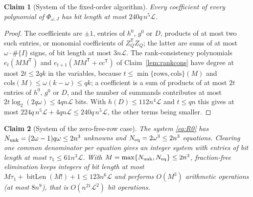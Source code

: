\documentclass[journal]{IEEEtran}
\theoremstyle{plainn}
\newtheorem{claim}{Claim}
\theoremstyle{remark}
\begin{document}
\begin{claim}[System of the fixed-order algorithm]\label{app:phi}
Every coefficient of every polynomial of $\Phi_{\omega,J}$ has bit length at most
$240q\,n^5\mathcal L$.
\end{claim}

\begin{proof}
The coefficients are $\pm1$, entries of $h^0$, $g^0$ or $D$, products of at most two such entries, or
monomial coefficients of $Z_Q^{\mathsf T}Z_Q$; the latter are sums of at most $\omega\cdot\#\{I\}$
signs, of bit length at most $3n\mathcal L$. The rank-consistency polynomials
$e_t(MM^{\mathsf T})$ and $e_{t+1}(MM^{\mathsf T}+cc^{\mathsf T})$ of Claim~\ref{lem:rankcons} have
degree at most $2t\le2qk$ in the variables, because $t\le\min\{\text{rows},\text{cols}\}(M)$ and
$\text{cols}(M)\le\omega(k-\omega)\le qk$; a coefficient is a sum of products of at most $2t$ entries
of $h^0$, $g^0$ or $D$, and the number of summands contributes at most
$2t\log_2(2q\omega)\le4qn\mathcal L$ bits. With $h(D)\le112n^4\mathcal L$ and $t\le qn$ this gives at
most $224q\,n^5\mathcal L+4qn\mathcal L\le240q\,n^5\mathcal L$, the other terms being smaller.
\end{proof}

\begin{claim}[System of the zero-free-row case]\label{app:r0}
The system \eqref{eq:R0} has $N_{\rm unk}=(2\omega-1)q\omega\le2n^3$ unknowns and
$N_{\rm eq}=2\omega^3\le2n^3$ equations. Clearing one common denominator per equation gives an integer
system with entries of bit length at most $\tau_1\le61n^3\mathcal L$. With
$M=\max\{N_{\rm unk},N_{\rm eq}\}\le2n^3$, fraction-free elimination keeps integers of bit length at
most $M\tau_1+\operatorname{bitLen}(M!)+1\le123n^6\mathcal L$ and performs $O(M^3)$ arithmetic operations (at
most $8n^9$), that is $O(n^{21}\mathcal L^2)$ bit operations.
\end{claim}
\end{document}
